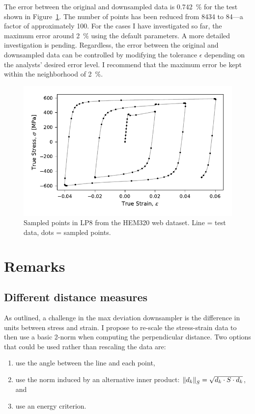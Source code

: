 \documentclass[a4paper,11pt]{article}
\begin{document}
The error between the original and downsampled data is 0.742~\% for the test shown in Figure~\ref{fig:hem320-lp8-results}.
The number of points has been reduced from 8434 to 84---a factor of approximately 100.
For the cases I have investigated so far, the maximum error around 2~\% using the default parameters.
A more detailed investigation is pending.
Regardless, the error between the original and downsampled data can be controlled by modifying the tolerance $\epsilon$ depending on the analysts' desired error level.
I recommend that the maximum error be kept within the neighborhood of 2~\%.


\begin{figure}
    \centering
    \includegraphics{HEM320_C_LP8_inds.pdf}
    \caption{Sampled points in LP8 from the HEM320 web dataset. Line = test data, dots = sampled points.}
    \label{fig:hem320-lp8-results}
\end{figure}

\section{Remarks}

\subsection{Different distance measures}

As outlined, a challenge in the max deviation downsampler is the difference in units between stress and strain.
I propose to re-scale the stress-strain data to then use a basic 2-norm when computing the perpendicular distance.
Two options that could be used rather than rescaling the data are:
\begin{enumerate}
    \item use the angle between the line and each point,
    \item use the norm induced by an alternative inner product: $\norm{d_k}_S = \sqrt{d_k \cdot S \cdot d_k}$, and
    \item use an energy criterion.
\end{enumerate}
\end{document}
